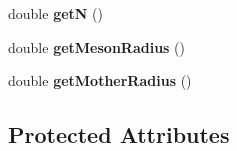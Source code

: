 \begin{DoxyCompactItemize}
\item 
\hypertarget{class_amp_kinematics_adccc4dcf170ea5e7ecc178fd890d5f67}{double {\bfseries get\-N} ()}\label{class_amp_kinematics_adccc4dcf170ea5e7ecc178fd890d5f67}

\item 
\hypertarget{class_amp_kinematics_a2d74e60226009affa6560f0f4611ad00}{double {\bfseries get\-Meson\-Radius} ()}\label{class_amp_kinematics_a2d74e60226009affa6560f0f4611ad00}

\item 
\hypertarget{class_amp_kinematics_a241070f8e5db82b4c36d49d8977289fe}{double {\bfseries get\-Mother\-Radius} ()}\label{class_amp_kinematics_a241070f8e5db82b4c36d49d8977289fe}

\end{DoxyCompactItemize}
\subsection*{Protected Attributes}
